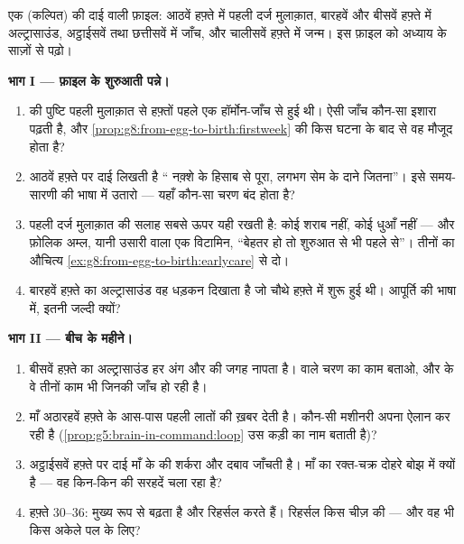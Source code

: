 \begin{problem}[{सप्ताहांत समस्या --- एक गर्भावस्था, मुलाक़ात-दर-मुलाक़ात
देखी हुई}]\label{pb:g8:from-egg-to-birth:1}
एक (कल्पित)  की दाई वाली फ़ाइल: आठवें हफ़्ते में पहली दर्ज
मुलाक़ात, बारहवें और बीसवें हफ़्ते में अल्ट्रासाउंड, अट्ठाईसवें तथा
छत्तीसवें में जाँच, और चालीसवें हफ़्ते में जन्म। इस फ़ाइल को अध्याय के
साज़ों से पढ़ो।

\medskip\noindent\textbf{भाग I --- फ़ाइल के शुरुआती पन्ने।}
\begin{enumerate}
  \item {} की पुष्टि पहली मुलाक़ात से हफ़्तों पहले एक
        हॉर्मोन-जाँच से हुई थी। ऐसी जाँच कौन-सा इशारा पढ़ती है, और
        \cref{prop:g8:from-egg-to-birth:firstweek} की किस घटना के बाद
        से वह मौजूद होता है?
  \item आठवें हफ़्ते पर दाई लिखती है `` नक़्शे के हिसाब से पूरा,
        लगभग सेम के दाने जितना''। इसे समय-सारणी की भाषा में उतारो ---
        यहाँ कौन-सा चरण बंद होता है?
  \item पहली दर्ज मुलाक़ात की सलाह सबसे ऊपर यही रखती है: कोई शराब
        नहीं, कोई धुआँ नहीं --- और फ़ोलिक अम्ल, यानी उसारी वाला एक
        विटामिन, ``बेहतर हो तो शुरुआत से भी पहले से''। तीनों का औचित्य
        \cref{ex:g8:from-egg-to-birth:earlycare} से दो।
  \item बारहवें हफ़्ते का अल्ट्रासाउंड वह धड़कन दिखाता है जो चौथे
        हफ़्ते में शुरू हुई थी। आपूर्ति की भाषा में, इतनी जल्दी
        क्यों?
\end{enumerate}

\medskip\noindent\textbf{भाग II --- बीच के महीने।}
\begin{enumerate}[resume]
  \item बीसवें हफ़्ते का अल्ट्रासाउंड हर अंग और  की जगह नापता है।
         वाले चरण का काम बताओ, और  के वे तीनों काम भी
        जिनकी जाँच हो रही है।
  \item माँ अठारहवें हफ़्ते के आस-पास पहली लातों की ख़बर देती है।
        कौन-सी मशीनरी अपना ऐलान कर रही है
        (\cref{prop:g5:brain-in-command:loop} उस कड़ी का नाम बताती
        है)?
  \item अट्ठाईसवें हफ़्ते पर दाई माँ के  की शर्करा और दबाव जाँचती
        है। माँ का रक्त-चक्र दोहरे बोझ में क्यों है --- वह किन-किन की
        सरहदें चला रहा है?
  \item हफ़्ते 30--36:  मुख्य रूप से बढ़ता है और 
        रिहर्सल करते हैं। रिहर्सल किस चीज़ की --- और वह भी किस अकेले
        पल के लिए?
\end{enumerate}


\end{problem}
